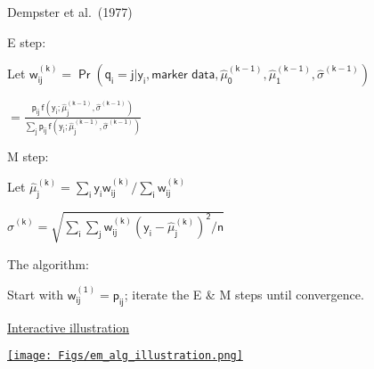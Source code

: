 \documentclass[12pt]{article}
\newcommand{\headsize}{\fontsize{35}{35} \selectfont}
\newcommand{\smallsize}{\fontsize{25}{30} \selectfont}
\begin{document}
\hfill
\begin{minipage}{10in}
\color{mywhite} \smallsize
 Dempster et al.\ (1977)
\vspace{5mm}

 {\color{mypink} E step}:
\vspace{5mm}

\hspace{10mm} Let \hspace{5mm} $\mathsf{w_{ij}^{(k)} = \Pr(q_i = j | y_i,\text{marker
data},\hat{\mu}_0^{(k-1)}, \hat{\mu}_1^{(k-1)},\hat{\sigma}^{(k-1)})}$
\vspace{5mm}

\hspace{56mm} $\mathsf{ = \frac{p_{ij} \,
f(y_i; \hat{\mu}_j^{(k-1)},\hat{\sigma}^{(k-1)})}{
\sum_j p_{ij} \, f(y_i; \hat{\mu}_j^{(k-1)},\hat{\sigma}^{(k-1)})}}$
\vspace{5mm}

 {\color{mypink} M step}:
\vspace{5mm}

\hspace{10mm} Let \hspace{5mm} $\mathsf{\hat{\mu}_j^{(k)} = \sum_i y_i w_{ij}^{(k)} / \sum_i
w_{ij}^{(k)}}$
\vspace{5mm}

\hspace{31.5mm} $\mathsf{\hat{\sigma}^{(k)} = \sqrt{ \sum_i \sum_j w_{ij}^{(k)}
(y_i-\hat{\mu}_j^{(k)})^2/n}}$
\vspace{5mm}

 {\color{mypink} The algorithm}:
\vspace{5mm}

\hspace{10mm} Start with $\mathsf{w_{ij}^{(1)} = p_{ij}}$; iterate the E \& M steps until
convergence.
\end{minipage}

\newpage

\headsize \color{myyellow}
\hfill \begin{minipage}{5.75in}
\centering
\href{http://www.biostat.wisc.edu/~kbroman/D3/em_alg/}{Interactive illustration}
\end{minipage}

\vfill

\centerline{\href{http://www.biostat.wisc.edu/~kbroman/D3/em_alg/}{\texttt{[image: Figs/em\_alg\_illustration.png]}}}

\vspace*{1cm}
\end{document}
